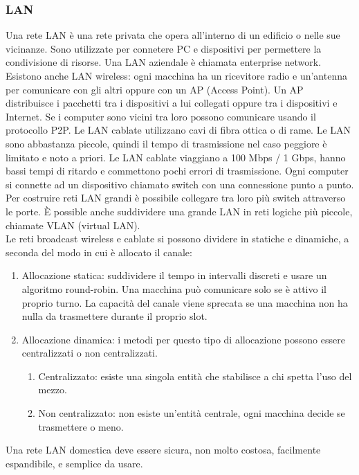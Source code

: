 \documentclass{article}
\begin{document}
			\subsubsection{LAN}
			Una rete LAN è una rete privata che opera all'interno di un edificio o nelle sue vicinanze. Sono utilizzate per connetere PC e dispositivi per permettere la condivisione di risorse. Una LAN aziendale è chiamata enterprise network. Esistono anche LAN wireless: ogni macchina ha un ricevitore radio e un'antenna per comunicare con gli altri oppure con un AP (Access Point). Un AP distribuisce i pacchetti tra i dispositivi a lui collegati oppure tra i dispositivi e Internet.
			Se i computer sono vicini tra loro possono comunicare usando il protocollo P2P.
			Le LAN cablate utilizzano cavi di fibra ottica o di rame. Le LAN sono abbastanza piccole, quindi il tempo di trasmissione nel caso peggiore è limitato e noto a priori. Le LAN cablate viaggiano a 100 Mbps / 1 Gbps, hanno bassi tempi di ritardo e commettono pochi errori di trasmissione. 
			Ogni computer si connette ad un  dispositivo chiamato switch con una connessione punto a punto. Per costruire reti LAN grandi è possibile collegare tra loro più switch attraverso le porte. 
			È possible anche suddividere una grande LAN in reti logiche più piccole, chiamate VLAN (virtual LAN).\\
			Le reti broadcast wireless e cablate si possono dividere in statiche e dinamiche, a seconda del modo in cui è allocato il canale:
			\begin{enumerate}
				\item Allocazione statica: suddividere il tempo in intervalli discreti e usare un algoritmo round-robin. Una macchina può comunicare solo se è attivo il proprio turno. La capacità del canale viene sprecata se una macchina non ha nulla da trasmettere durante il proprio slot.
				\item Allocazione dinamica: i metodi per questo tipo di allocazione possono essere centralizzati o non centralizzati.
				\begin{enumerate}
					\item Centralizzato: esiste una singola entità che stabilisce a chi spetta l'uso del mezzo.
					\item Non centralizzato: non esiste un'entità centrale, ogni macchina decide se trasmettere o meno.
				\end{enumerate}				
			\end{enumerate}
			Una rete LAN domestica deve essere sicura, non molto costosa, facilmente espandibile, e semplice da usare.
\end{document}
